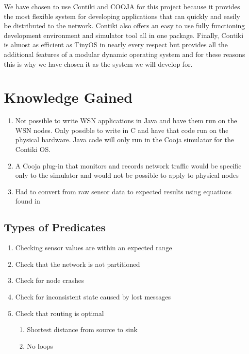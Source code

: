 \documentclass[a4paper,notitlepage]{article}
\begin{document}
We have chosen to use Contiki and COOJA for this project because it provides the most flexible system for developing applications that can quickly and easily be distributed to the network. Contiki also offers an easy to use fully functioning development environment and simulator tool all in one package. Finally, Contiki is almost as efficient as TinyOS in nearly every respect but provides all the additional features of a modular dynamic operating system and for these reasons this is why we have chosen it as the system we will develop for.  

\clearpage



\clearpage


\section{Knowledge Gained}
\begin{enumerate}
	\item Not possible to write WSN applications in Java and have them run on the WSN nodes. Only possible to write in C and have that code run on the physical hardware. Java code will only run in the Cooja simulator for the Contiki OS.
	\item A Cooja plug-in that monitors and records network traffic would be specific only to the simulator and would not be possible to apply to physical nodes
	\item Had to convert from raw sensor data to expected results using equations found in \cite{sensiriondatasheet}
\end{enumerate}

\subsection{Types of Predicates}
\begin{enumerate}
	\item Checking sensor values are within an expected range
	\item Check that the network is not partitioned
	\item Check for node crashes
	\item Check for inconsistent state caused by lost messages
	\item Check that routing is optimal
	\begin{enumerate}
		\item Shortest distance from source to sink
		\item No loops
	\end{enumerate}
\end{enumerate}
\end{document}

